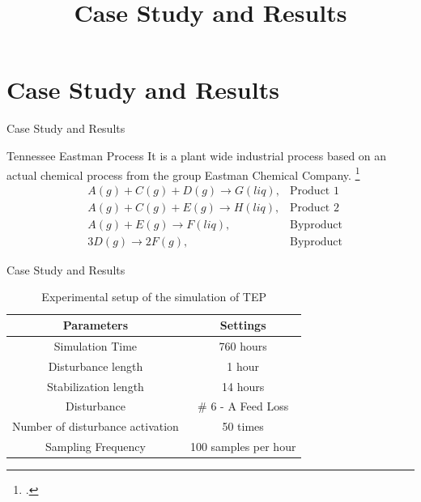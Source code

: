 \section{Case Study and Results}
\title{Case Study and Results}
\begin{frame}{Case Study and Results}

\begin{block}{Tennessee Eastman Process}
It is a plant wide industrial process based on an actual chemical process from the group Eastman Chemical Company. \footcite{downs1993plant}
    \begin{equation}
        \begin{matrix}
            & A(g) + C(g) + D(g) \rightarrow G(liq), & \text{Product 1} \\
            & A(g) + C(g) + E(g) \rightarrow H(liq), & \text{Product 2} \\
            & A(g) + E(g) \rightarrow F(liq), & \text{Byproduct} \\
            & 3D(g) \rightarrow 2F(g), & \text{Byproduct}
        \end{matrix}
    \label{eq:tep_react}
    \end{equation}
\end{block}
\end{frame}

\begin{frame}[c]{Case Study and Results}

    \BlankLine
    \BlankLine
    \begin{table}[!h]
        \centering
        \begin{tabular}{|c|c|}
        \hline
        \textbf{Parameters}    &  \textbf{Settings}\\
        \hline
        Simulation Time     &  760 hours \\
        \hline
        Disturbance length & 1 hour\\
        \hline
        Stabilization length & 14 hours\\
        \hline
        Disturbance &   \# 6 - A Feed Loss \\
        \hline
        Number of disturbance activation  & 50 times\\ 
        \hline
        Sampling Frequency & 100 samples per hour \\
        \hline
        \end{tabular}
    
        \caption{Experimental setup of the simulation of TEP}
        \label{tab:tepSetup}
    \end{table}
\end{frame}

